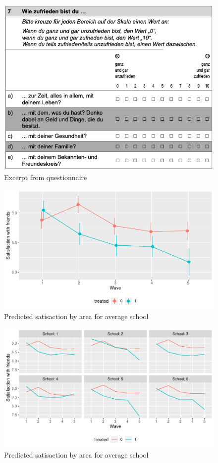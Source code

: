 \documentclass[a4, 12pt]{article}
\begin{document}
\hypertarget{appendix-appendix}{%
\appendix}


\begin{figure}[H]

{\centering \includegraphics[width=0.8\linewidth,]{../figures/questionnaire_satisfaction} 

}

\caption{Excerpt from questionnaire}\label{fig:questionnaire}
\end{figure}
\begin{figure}[H]

{\centering \includegraphics[width=0.8\linewidth,]{../figures/sat_friends_pred} 

}

\caption{Predicted satisaction by area for average school}\label{fig:sat-friends-pred}
\end{figure}
\begin{figure}[H]

{\centering \includegraphics[width=0.8\linewidth,]{../figures/sat_friends_pred_across_schools} 

}

\caption{Predicted satisaction by area for average school}\label{fig:sat-friends-pred-across-schools}
\end{figure}
\end{document}
